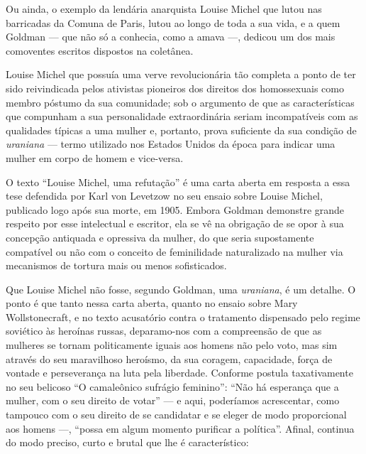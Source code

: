 Ou ainda, o exemplo da lendária
anarquista Louise Michel que lutou nas barricadas da Comuna de Paris,
lutou ao longo de toda a sua vida, e a quem Goldman --- que não só a
conhecia, como a amava ---, dedicou um dos mais comoventes escritos
dispostos na coletânea.


Louise Michel que possuía uma verve
revolucionária tão completa a ponto de ter sido reivindicada pelos
ativistas pioneiros dos direitos dos homossexuais como membro póstumo da
sua comunidade; sob o argumento de que as características que compunham
a sua personalidade extraordinária seriam incompatíveis com as
qualidades típicas a uma mulher e, portanto, prova suficiente da sua
condição de \textit{uraniana} --- termo utilizado nos Estados Unidos da época
para indicar uma mulher em corpo de homem e vice-versa.

O texto ``Louise
Michel, uma refutação'' é uma carta aberta em
resposta a essa tese defendida por Karl von Levetzow no seu ensaio sobre
Louise Michel, publicado logo após sua morte, em 1905. Embora Goldman
demonstre grande respeito por esse intelectual e escritor, ela se vê na
obrigação de se opor à sua concepção antiquada e opressiva da mulher, do
que seria supostamente compatível ou não com o conceito de
feminilidade naturalizado na mulher via mecanismos de tortura mais
ou menos sofisticados.

Que Louise Michel não fosse, segundo Goldman, uma \textit{uraniana}, é
um detalhe. O ponto é que tanto nessa carta aberta, quanto no
ensaio sobre Mary Wollstonecraft, e no texto acusatório contra o
tratamento dispensado pelo regime soviético às heroínas russas,
deparamo-nos com a compreensão de que as mulheres se tornam
politicamente iguais aos homens não pelo voto, mas sim através do seu
maravilhoso heroísmo, da sua coragem, capacidade, força de vontade e
perseverança na luta pela liberdade. Conforme postula taxativamente no
seu belicoso ``O camaleônico sufrágio feminino'': ``Não há
esperança que a mulher, com o seu direito de votar'' --- e aqui,
poderíamos acrescentar, como tampouco com o seu direito de se
candidatar e se eleger de modo proporcional aos homens ---, ``possa em
algum momento purificar a política''. Afinal, continua do modo preciso,
curto e brutal que lhe é característico:

